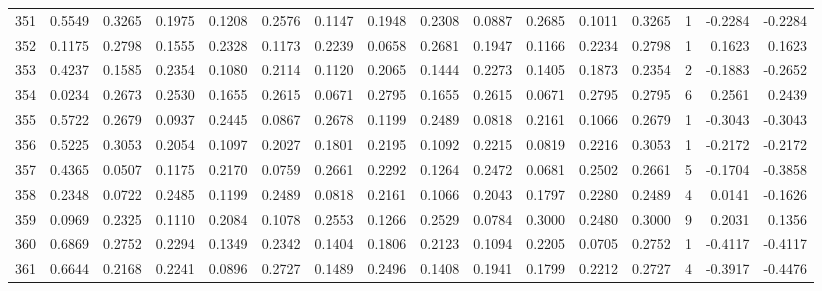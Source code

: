 \begin{tabular}{lrrrrrrrrrrrrrrr}
351 &      0.5549 &  0.3265 &  0.1975 &  0.1208 &  0.2576 &  0.1147 &  0.1948 &  0.2308 &  0.0887 &  0.2685 &   0.1011 &     0.3265 &      1 &                   -0.2284 &                    -0.2284 \\
352 &      0.1175 &  0.2798 &  0.1555 &  0.2328 &  0.1173 &  0.2239 &  0.0658 &  0.2681 &  0.1947 &  0.1166 &   0.2234 &     0.2798 &      1 &                    0.1623 &                     0.1623 \\
353 &      0.4237 &  0.1585 &  0.2354 &  0.1080 &  0.2114 &  0.1120 &  0.2065 &  0.1444 &  0.2273 &  0.1405 &   0.1873 &     0.2354 &      2 &                   -0.1883 &                    -0.2652 \\
354 &      0.0234 &  0.2673 &  0.2530 &  0.1655 &  0.2615 &  0.0671 &  0.2795 &  0.1655 &  0.2615 &  0.0671 &   0.2795 &     0.2795 &      6 &                    0.2561 &                     0.2439 \\
355 &      0.5722 &  0.2679 &  0.0937 &  0.2445 &  0.0867 &  0.2678 &  0.1199 &  0.2489 &  0.0818 &  0.2161 &   0.1066 &     0.2679 &      1 &                   -0.3043 &                    -0.3043 \\
356 &      0.5225 &  0.3053 &  0.2054 &  0.1097 &  0.2027 &  0.1801 &  0.2195 &  0.1092 &  0.2215 &  0.0819 &   0.2216 &     0.3053 &      1 &                   -0.2172 &                    -0.2172 \\
357 &      0.4365 &  0.0507 &  0.1175 &  0.2170 &  0.0759 &  0.2661 &  0.2292 &  0.1264 &  0.2472 &  0.0681 &   0.2502 &     0.2661 &      5 &                   -0.1704 &                    -0.3858 \\
358 &      0.2348 &  0.0722 &  0.2485 &  0.1199 &  0.2489 &  0.0818 &  0.2161 &  0.1066 &  0.2043 &  0.1797 &   0.2280 &     0.2489 &      4 &                    0.0141 &                    -0.1626 \\
359 &      0.0969 &  0.2325 &  0.1110 &  0.2084 &  0.1078 &  0.2553 &  0.1266 &  0.2529 &  0.0784 &  0.3000 &   0.2480 &     0.3000 &      9 &                    0.2031 &                     0.1356 \\
360 &      0.6869 &  0.2752 &  0.2294 &  0.1349 &  0.2342 &  0.1404 &  0.1806 &  0.2123 &  0.1094 &  0.2205 &   0.0705 &     0.2752 &      1 &                   -0.4117 &                    -0.4117 \\
361 &      0.6644 &  0.2168 &  0.2241 &  0.0896 &  0.2727 &  0.1489 &  0.2496 &  0.1408 &  0.1941 &  0.1799 &   0.2212 &     0.2727 &      4 &                   -0.3917 &                    -0.4476 \\

\end{tabular}
